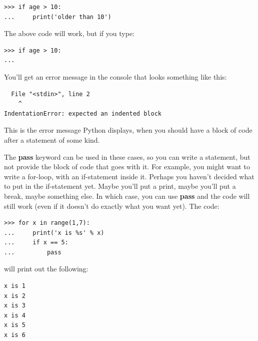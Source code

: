 \begin{listing}
\begin{verbatim}
>>> if age > 10:
...     print('older than 10')
\end{verbatim}
\end{listing}

\noindent
The above code will work, but if you type:

\begin{listingignore}
\begin{verbatim}
>>> if age > 10:
...
\end{verbatim}
\end{listingignore}

\noindent
You'll get an error message in the console that looks something like this:

\begin{listingignore}
\begin{verbatim}
  File "<stdin>", line 2
    ^
IndentationError: expected an indented block
\end{verbatim}
\end{listingignore}

This is the error message Python displays, when you should have a block of code after a statement of some kind.
\par
The \textbf{pass} keyword can be used in these cases, so you can write a statement, but not provide the block of code that goes with it.  For example, you might want to write a for-loop, with an if-statement inside it.  Perhaps you haven't decided what to put in the if-statement yet.  Maybe you'll put a print, maybe you'll put a break, maybe something else.  In which case, you can use \textbf{pass} and the code will still work (even if it doesn't do exactly what you want yet).  The code:

\begin{listing}
\begin{verbatim}
>>> for x in range(1,7):
...     print('x is %s' % x)
...     if x == 5:
...         pass
\end{verbatim}
\end{listing}

\noindent
will print out the following:

\begin{listing}
\begin{verbatim}
x is 1
x is 2
x is 3
x is 4
x is 5
x is 6
\end{verbatim}
\end{listing}

